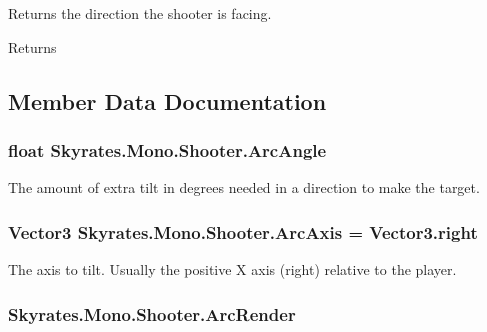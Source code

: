 Returns the direction the shooter is facing. 

\begin{DoxyReturn}{Returns}

\end{DoxyReturn}


\subsection{Member Data Documentation}
\hypertarget{class_skyrates_1_1_mono_1_1_shooter_abaae952aac7747233bd57d2322c71846}{
\subsubsection[{Arc\-Angle}]{\setlength{\rightskip}{0pt plus 5cm}float Skyrates.\-Mono.\-Shooter.\-Arc\-Angle}}\label{class_skyrates_1_1_mono_1_1_shooter_abaae952aac7747233bd57d2322c71846}


The amount of extra tilt in degrees needed in a direction to make the target. 

\hypertarget{class_skyrates_1_1_mono_1_1_shooter_ae2d4b315241e263d72fdabc0a17eb922}{
\subsubsection[{Arc\-Axis}]{\setlength{\rightskip}{0pt plus 5cm}Vector3 Skyrates.\-Mono.\-Shooter.\-Arc\-Axis = Vector3.\-right}}\label{class_skyrates_1_1_mono_1_1_shooter_ae2d4b315241e263d72fdabc0a17eb922}


The axis to tilt. Usually the positive X axis (right) relative to the player. 

\hypertarget{class_skyrates_1_1_mono_1_1_shooter_aaa84e4951d4f08f9d08a714ef8376c30}{
\subsubsection[{Arc\-Render}]{ Skyrates.\-Mono.\-Shooter.\-Arc\-Render}}\label{class_skyrates_1_1_mono_1_1_shooter_aaa84e4951d4f08f9d08a714ef8376c30}


